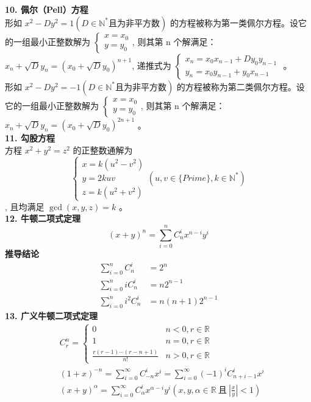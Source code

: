 \textbf{10. 佩尔（Pell）方程}\\
形如 $x^2-Dy^2=1 (D\in\mathbb{N^{*}}\text{且为非平方数})$ 的方程被称为第一类佩尔方程。设它的一组最小正整数解为 $\begin{cases}x=x_0\\ y=y_0\end{cases}$, 则其第 n 个解满足：$x_n+\sqrt{D}y_n=(x_0+\sqrt{D}y_0)^{n+1}$, 递推式为 $\begin{cases}x_n=x_0x_{n-1}+Dy_0y_{n-1}\\ y_n=x_0y_{n-1}+y_0x_{n-1}\end{cases}$ 。\\
形如 $x^2-Dy^2=-1 (D\in\mathbb{N^{*}}\text{且为非平方数})$ 的方程被称为第二类佩尔方程。设它的一组最小正整数解为 $\begin{cases}x=x_0\\ y=y_0\end{cases}$, 则其第 n 个解满足：$x_n+\sqrt{D}y_n=(x_0+\sqrt{D}y_0)^{2n+1}$ 。\\
\textbf{11. 勾股方程}\\
方程 $x^2+y^2=z^2$ 的正整数通解为 $$\begin{cases}x=k(u^2-v^2)\\ y=2kuv\\ z=k(u^2+v^2)\end{cases}(u,v\in\{Prime\},k\in\mathbb{N^{*}})$$, 且均满足 $\gcd(x,y,z)=k$ 。\\
\textbf{12. 牛顿二项式定理}\\
$$(x+y)^{n}=\sum_{i=0}^{n}C_{n}^{i}x^{n-i}y^i$$
\textbf{推导结论} \\
$$
\begin{aligned}
    \sum_{i=0}^{n}C_n^{i}&=2^n\\
    \sum_{i=0}^{n}iC_n^{i}&=n2^{n-1}\\
    \sum_{i=0}^{n}i^2C_n^{i}&=n(n+1)2^{n-1} 
\end{aligned}
$$
\textbf{13. 广义牛顿二项式定理} 
$$
\begin{aligned}
    &C_{r}^{n}=\begin{cases}0&n<0,r\in\mathbb{R}\\ 1&n=0,r\in\mathbb{R}\\ \frac{r(r-1)\cdots(r-n+1)}{n!}&n>0,r\in\mathbb{R}\end{cases}\\
    &(1+x)^{-n}=\sum_{i=0}^{\infty}C_{-n}^{i}x^{i}=\sum_{i=0}^{\infty}(-1)^iC_{n+i-1}^{i}x^i\\
    &(x+y)^{\alpha}=\sum_{i=0}^{\infty}C_{\alpha}^{i}x^{\alpha-i}y^i (x,y,\alpha\in\mathbb{R}\ \text{且}\ |\frac{x}{y}|<1)
\end{aligned}
$$
